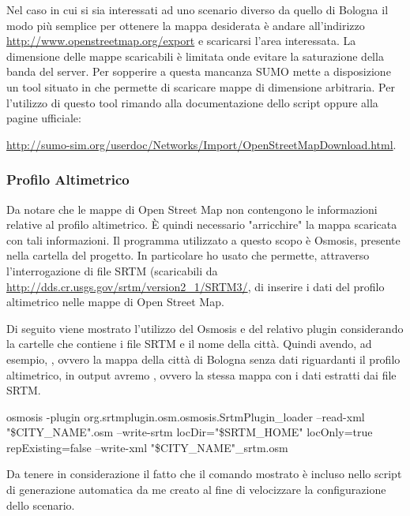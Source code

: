 Nel caso in cui si sia interessati ad uno scenario diverso da quello di Bologna il modo più semplice per ottenere la mappa desiderata è andare all'indirizzo \url{http://www.openstreetmap.org/export} e scaricarsi l'area interessata. La dimensione delle mappe scaricabili è limitata onde evitare la saturazione della banda del server. Per sopperire a questa mancanza SUMO mette a disposizione un tool situato in  che permette di scaricare mappe di dimensione arbitraria. Per l'utilizzo di questo tool rimando alla documentazione dello script oppure alla pagine ufficiale:

\url{http://sumo-sim.org/userdoc/Networks/Import/OpenStreetMapDownload.html}.

\subsubsection{Profilo Altimetrico}\label{profilo-altimetrico}

Da notare che le mappe di Open Street Map non contengono le informazioni relative al profilo altimetrico. È quindi necessario "arricchire" la mappa scaricata con tali informazioni. Il programma utilizzato a questo scopo è Osmosis, presente nella cartella  del progetto. In particolare ho usato  che permette, attraverso l'interrogazione di file SRTM (scaricabili da \url{http://dds.cr.usgs.gov/srtm/version2_1/SRTM3/}, di inserire i dati del profilo altimetrico nelle mappe di Open Street Map. 

Di seguito viene mostrato l'utilizzo del Osmosis e del relativo plugin considerando  la cartelle che contiene i file SRTM e  il nome della città. Quindi avendo, ad esempio, , ovvero la mappa della città di Bologna senza dati riguardanti il profilo altimetrico, in output avremo , ovvero la stessa mappa con i dati estratti dai file SRTM.

\begin{bash}
osmosis -plugin org.srtmplugin.osm.osmosis.SrtmPlugin_loader --read-xml "\$CITY_NAME".osm --write-srtm locDir="\$SRTM_HOME" locOnly=true repExisting=false --write-xml "\$CITY_NAME"_srtm.osm
\end{bash}

%

Da tenere in considerazione il fatto che il comando mostrato è incluso nello script di generazione automatica da me creato al fine di velocizzare la configurazione dello scenario.

